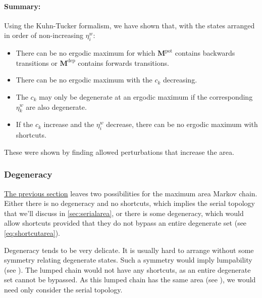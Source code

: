 \documentclass[12pt]{article}
\newcommand{\etwm}{\eta^w}
\newcommand{\MMdm}{M}
\newcommand{\MMd}{\mathbf{\MMdm}}
\newcommand{\pot}{^{\text{pot}}}
\newcommand{\dep}{^{\text{dep}}}
\begin{document}
\paragraph{Summary:}\label{sec:pertsummary}

Using the Kuhn-Tucker formalism, we have shown that,
with the states arranged in order of non-increasing $\etwm_i$:
%
\begin{itemize}
  \item There can be no ergodic maximum for which $\MMd\pot$ contains backwards transitions or $\MMd\dep$ contains forwards transitions.
  \item There can be no ergodic maximum with the $c_k$ decreasing.
  \item The $c_k$ may only be degenerate at an ergodic maximum if the corresponding $\etwm_k$ are also degenerate.
  \item If the $c_k$ increase and the $\etwm_i$ decrease, there can be no ergodic maximum with shortcuts.
\end{itemize}
%
These were shown by finding allowed perturbations that increase the area.


\subsubsection{Degeneracy}\label{sec:degeneracy_area}

\hyperref[sec:areapert]{The previous section} leaves two possibilities for the maximum area Markov chain.
Either there is no degeneracy and no shortcuts, which implies the serial topology that we'll discuss in \cref{sec:serialarea}, or there is some degeneracy, which would allow shortcuts provided that they do not bypass an entire degenerate set (see \cref{eq:shortcutarea}).

Degeneracy tends to be very delicate. 
It is usually hard to arrange without some symmetry relating degenerate states. 
Such a symmetry would imply lumpability (see \cite{kemeny1960finite,Ball1993Lumpability,burke1958markovian}). 
The lumped chain would not have any shortcuts, as an entire degenerate set cannot be bypassed. 
As this lumped chain has the same area (see \cite{Lahiri2013synapse}), we would need only consider the serial topology.
\end{document}
